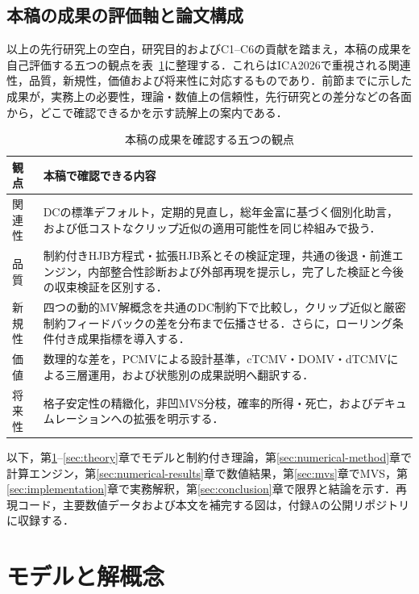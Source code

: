 \documentclass[10pt,a4paper]{article}
\theoremstyle{plain}
\theoremstyle{definition}
\begin{document}
\subsection{本稿の成果の評価軸と論文構成}
\label{sec:evaluation-roadmap}

以上の先行研究上の空白，研究目的およびC1--C6の貢献を踏まえ，本稿の成果を自己評価する五つの観点を表~\ref{tab:ica-response-40}に整理する．これらはICA2026で重視される関連性，品質，新規性，価値および将来性に対応するものであり．前節までに示した成果が，実務上の必要性，理論・数値上の信頼性，先行研究との差分などの各面から，どこで確認できるかを示す読解上の案内である．

\begin{table}[H]
\centering
\footnotesize
\caption{本稿の成果を確認する五つの観点}
\label{tab:ica-response-40}
\begin{tabularx}{\textwidth}{p{18mm}X}
\toprule
観点 & 本稿で確認できる内容 \\
\midrule
関連性
& DCの標準デフォルト，定期的見直し，総年金富に基づく個別化助言，および低コストなクリップ近似の適用可能性を同じ枠組みで扱う．\\
品質
& 制約付きHJB方程式・拡張HJB系とその検証定理，共通の後退・前進エンジン，内部整合性診断および外部再現を提示し，完了した検証と今後の収束検証を区別する．\\
新規性
& 四つの動的MV解概念を共通のDC制約下で比較し，クリップ近似と厳密制約フィードバックの差を分布まで伝播させる．さらに，ローリング条件付き成果指標を導入する．\\
価値
& 数理的な差を，PCMVによる設計基準，cTCMV・DOMV・dTCMVによる三層運用，および状態別の成果説明へ翻訳する．\\
将来性
& 格子安定性の精緻化，非凹MVS分枝，確率的所得・死亡，およびデキュムレーションへの拡張を明示する．\\
\bottomrule
\end{tabularx}
\end{table}

以下，第\ref{sec:model}--\ref{sec:theory}章でモデルと制約付き理論，第\ref{sec:numerical-method}章で計算エンジン，第\ref{sec:numerical-results}章で数値結果，第\ref{sec:mvs}章でMVS，第\ref{sec:implementation}章で実務解釈，第\ref{sec:conclusion}章で限界と結論を示す．再現コード，主要数値データおよび本文を補完する図は，付録Aの公開リポジトリに収録する．

\section{モデルと解概念}
\label{sec:model}
\end{document}
